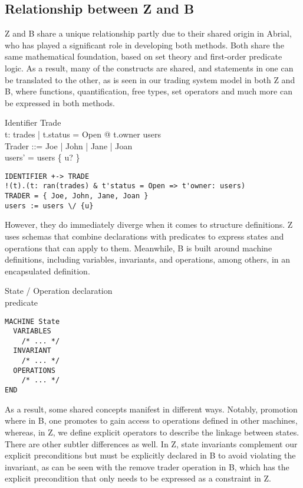 \documentclass{article}
\begin{document}
\subsection*{Relationship between Z and B}

Z and B share a unique relationship partly due to their shared origin in Abrial, who has played a significant role in developing both methods. Both share the same mathematical foundation, based on set theory and first-order predicate logic. As a result, many of the constructs are shared, and statements in one can be translated to the other, as is seen in our trading system model in both Z and B, where functions, quantification, free types, set operators and much more can be expressed in both methods.
\begin{zed}
Identifier \pfun Trade \\
\forall t: \ran trades | t.status = Open @ t.owner \in users \\
Trader ::= Joe | John | Jane | Joan  \\
users' = users \setminus \{ u? \} \\
\end{zed}

\begin{verbatim}
IDENTIFIER +-> TRADE
!(t).(t: ran(trades) & t'status = Open => t'owner: users)
TRADER = { Joe, John, Jane, Joan }
users := users \/ {u}
\end{verbatim}

\hspace{-0.68cm} However, they do immediately diverge when it comes to structure definitions. Z uses schemas that combine declarations with predicates to express states and operations that can apply to them. Meanwhile, B is built around machine definitions, including variables, invariants, and operations, among others, in an encapsulated definition.

\begin{schema}{State / Operation}
declaration \\
\where 
predicate \\
\end{schema}

\begin{verbatim}
MACHINE State
  VARIABLES
    /* ... */
  INVARIANT
    /* ... */
  OPERATIONS
    /* ... */
END
\end{verbatim}

\hspace{-0.68cm} As a result, some shared concepts manifest in different ways. Notably, promotion where in B, one promotes to gain access to operations defined in other machines, whereas, in Z, we define explicit operators to describe the linkage between states. There are other subtler differences as well. In Z, state invariants complement our explicit preconditions but must be explicitly declared in B to avoid violating the invariant, as can be seen with the remove trader operation in B, which has the explicit precondition that only needs to be expressed as a constraint in Z.
\end{document}
